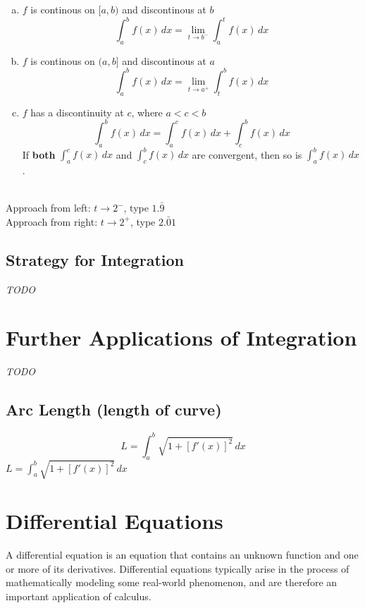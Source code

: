 \documentclass[8pt,letterpaper]{article}
\begin{document}
\begin{enumerate}[(a)]
\item $f$ is continous on $[a,b)$ and discontinous at $b$
  \begin{equation*}
  \int_a^b f(x)\,dx = \lim_{t \to b^-} \int_a^t f(x)\,dx
  \end{equation*}
\item $f$ is continous on $(a,b]$ and discontinous at $a$
  \begin{equation*}
  \int_a^b f(x)\,dx = \lim_{t \to a^+} \int_t^b f(x)\,dx
  \end{equation*}
\item $f$ has a discontinuity at $c$, where $a < c < b$
  \begin{equation*}
  \int_a^b f(x)\,dx = \int_a^c f(x)\,dx + \int_c^b f(x)\,dx
  \end{equation*}
  If \textbf{both} $\int_a^c f(x)\,dx$ and $\int_c^b f(x)\,dx$ are convergent,
  then so is $\int_a^b f(x)\,dx$.
\end{enumerate}

\noindent {} \\
Approach from left: $t \rightarrow 2^-$, type $1.\bar{9}$ \\
Approach from right: $t \rightarrow 2^+$, type $2.\bar{0}1$

\subsection*{Strategy for Integration} %
\emph{TODO}

\section{Further Applications of Integration} %
\emph{TODO}

\subsection*{Arc Length (length of curve)}
\begin{equation}
L = \int_a^b \sqrt{1 + [f'(x)]^2} \, dx
\end{equation}
$L = \int_a^b \sqrt{1 + [f'(x)]^2} \, dx$

\section{Differential Equations} %
A differential equation is an equation that contains an unknown function and one or more
of its derivatives.
Differential equations typically arise in the process of mathematically modeling some real-world
phenomenon, and are therefore an important application of calculus.
\end{document}
